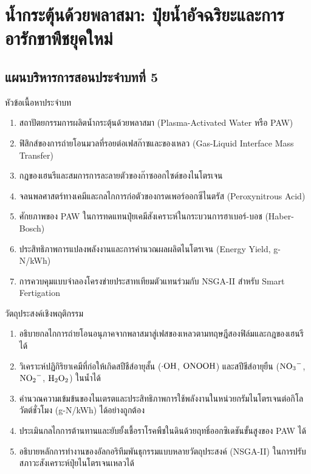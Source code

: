 \chapter{น้ำกระตุ้นด้วยพลาสมา: ปุ๋ยน้ำอัจฉริยะและการอารักขาพืชยุคใหม่}
\label{chap:ch05}


\vspace*{-6pt}
\section*{แผนบริหารการสอนประจำบทที่ 5}

\begin{planbox}{หัวข้อเนื้อหาประจำบท}
\begin{enumerate}
    \item สถาปัตยกรรมการผลิตน้ำกระตุ้นด้วยพลาสมา (Plasma-Activated Water หรือ PAW)
    \item ฟิสิกส์ของการถ่ายโอนมวลที่รอยต่อเฟสก๊าซและของเหลว (Gas-Liquid Interface Mass Transfer)
    \item กฎของเฮนรีและสมการการละลายตัวของก๊าซออกไซด์ของไนโตรเจน
    \item จลนพลศาสตร์ทางเคมีและกลไกการก่อตัวของกรดเพอร์ออกซีไนตรัส (Peroxynitrous Acid)
    \item ศักยภาพของ PAW ในการทดแทนปุ๋ยเคมีสังเคราะห์ในกระบวนการฮาเบอร์-บอช (Haber-Bosch)
    \item ประสิทธิภาพการแปลงพลังงานและการคำนวณผลผลิตไนโตรเจน (Energy Yield, g-N/kWh)
    \item การควบคุมแบบจำลองโครงข่ายประสาทเทียมตัวแทนร่วมกับ NSGA-II สำหรับ Smart Fertigation
\end{enumerate}
\end{planbox}

\begin{planbox}{วัตถุประสงค์เชิงพฤติกรรม}
\begin{enumerate}
    \item อธิบายกลไกการถ่ายโอนอนุภาคจากพลาสมาสู่เฟสของเหลวตามทฤษฎีสองฟิล์มและกฎของเฮนรีได้
    \item วิเคราะห์ปฏิกิริยาเคมีที่ก่อให้เกิดสปีชีส์อายุสั้น ($\cdot\ce{OH}$, $\ce{ONOOH}$) และสปีชีส์อายุยืน ($\ce{NO3-}$, $\ce{NO2-}$, $\ce{H2O2}$) ในน้ำได้
    \item คำนวณความเข้มข้นของไนเตรตและประสิทธิภาพการใช้พลังงานในหน่วยกรัมไนโตรเจนต่อกิโลวัตต์ชั่วโมง (g-N/kWh) ได้อย่างถูกต้อง
    \item ประเมินกลไกการต้านทานและยับยั้งเชื้อราโรคพืชในดินด้วยฤทธิ์ออกซิเดชันขั้นสูงของ PAW ได้
    \item อธิบายหลักการทำงานของอัลกอริทึมพันธุกรรมแบบหลายวัตถุประสงค์ (NSGA-II) ในการปรับสภาวะสังเคราะห์ปุ๋ยไนโตรเจนเหลวได้
\end{enumerate}
\end{planbox}


